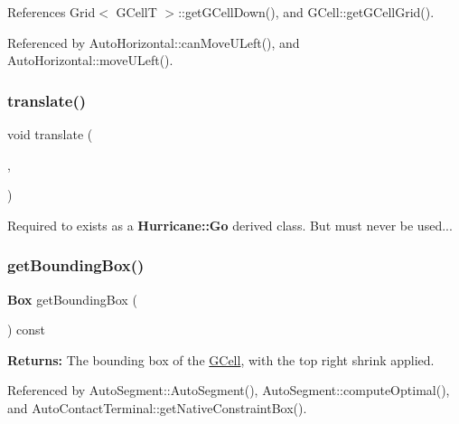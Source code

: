 References Grid$<$ G\+Cell\+T $>$\+::get\+G\+Cell\+Down(), and G\+Cell\+::get\+G\+Cell\+Grid().



Referenced by Auto\+Horizontal\+::can\+Move\+U\+Left(), and Auto\+Horizontal\+::move\+U\+Left().

\mbox{\label{classKatabatic_1_1GCell_a819f3ffbba69e4de2a19c827676b5aee}} 
\subsubsection{\texorpdfstring{translate()}{translate()}}
{\footnotesize\ttfamily void translate (\begin{DoxyParamCaption}\item[{const \textbf{ Db\+U\+::\+Unit} \&}]{,  }\item[{const \textbf{ Db\+U\+::\+Unit} \&}]{ }\end{DoxyParamCaption})\hspace{0.3cm}{\ttfamily [virtual]}}

Required to exists as a \textbf{ Hurricane\+::\+Go} derived class. But must never be used... \mbox{\label{classKatabatic_1_1GCell_ab5d8bf98ab5af6fcfebea1b9f446d5d7}} 
\subsubsection{\texorpdfstring{get\+Bounding\+Box()}{getBoundingBox()}}
{\footnotesize\ttfamily \textbf{ Box} get\+Bounding\+Box (\begin{DoxyParamCaption}{ }\end{DoxyParamCaption}) const\hspace{0.3cm}{\ttfamily [virtual]}}

{\bfseries Returns\+:} The bounding box of the \mbox{\hyperlink{classKatabatic_1_1GCell}{G\+Cell}}, with the top right shrink applied. 

Referenced by Auto\+Segment\+::\+Auto\+Segment(), Auto\+Segment\+::compute\+Optimal(), and Auto\+Contact\+Terminal\+::get\+Native\+Constraint\+Box().

